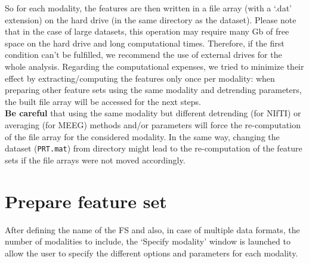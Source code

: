 So for each modality, the features are then written in a file array (with a `.dat' extension) on the hard drive (in the same directory as the dataset). Please note that in the case of large datasets, this operation may require many Gb of free space on the hard drive and long computational times. Therefore, if the first condition can't be fulfilled, we recommend the use of external drives for the whole analysis. Regarding the computational expenses, we tried to minimize their effect by extracting/computing the features only once per modality: when preparing other feature sets using the same modality and detrending parameters, the built file array will be accessed for the next steps.
\\


{\bf Be careful} that using the same modality but different detrending (for NIfTI) or averaging (for MEEG) methods and/or parameters will force the re-computation of the file array for the considered modality. In the same way, changing the dataset ({\tt PRT.mat}) from directory might lead to the re-computation of the feature sets if the file arrays were not moved accordingly.  %












\section{Prepare feature set}
After defining the name of the FS and also, in case of multiple data formats, the number of modalities to include, the `Specify modality' window is launched to allow the user to specify the different options and parameters for each modality.

